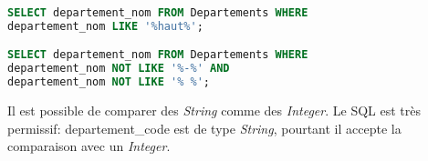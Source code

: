 \documentclass[svgnames,11pt]{beamer}
\begin{document}
\begin{frame}[fragile]
    \frametitle{}

\begin{center}
\begin{lstlisting}[language=SQL , basicstyle=\ttfamily\small, xleftmargin=1em, xrightmargin=0em]
SELECT departement_nom FROM Departements WHERE
departement_nom LIKE '%haut%';

SELECT departement_nom FROM Departements WHERE
departement_nom NOT LIKE '%-%' AND 
departement_nom NOT LIKE '% %';
\end{lstlisting}
\end{center}    
\begin{aretenir}[Remarque]
    Il est possible de comparer des \emph{String} comme des \emph{Integer}. Le SQL est très permissif: departement\_code est de type \emph{String}, pourtant il accepte la comparaison avec un \emph{Integer}.
    \end{aretenir}
\end{frame}
\end{document}
